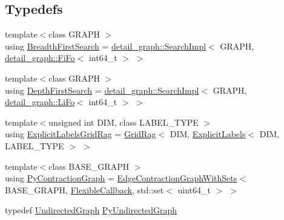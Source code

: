 \subsection*{Typedefs}
\begin{DoxyCompactItemize}
\item 
{\footnotesize template$<$class G\+R\+A\+PH $>$ }\\using \hyperlink{namespacenifty_1_1graph_a5cdea7eb940a178738d5f7ba11b92a15}{Breadth\+First\+Search} = \hyperlink{classnifty_1_1graph_1_1detail__graph_1_1SearchImpl}{detail\+\_\+graph\+::\+Search\+Impl}$<$ G\+R\+A\+PH, \hyperlink{structnifty_1_1graph_1_1detail__graph_1_1FiFo}{detail\+\_\+graph\+::\+Fi\+Fo}$<$ int64\+\_\+t $>$ $>$
\item 
{\footnotesize template$<$class G\+R\+A\+PH $>$ }\\using \hyperlink{namespacenifty_1_1graph_a3d6d4a5216a5d0a11785373bc7537085}{Depth\+First\+Search} = \hyperlink{classnifty_1_1graph_1_1detail__graph_1_1SearchImpl}{detail\+\_\+graph\+::\+Search\+Impl}$<$ G\+R\+A\+PH, \hyperlink{structnifty_1_1graph_1_1detail__graph_1_1LiFo}{detail\+\_\+graph\+::\+Li\+Fo}$<$ int64\+\_\+t $>$ $>$
\item 
{\footnotesize template$<$unsigned int D\+IM, class L\+A\+B\+E\+L\+\_\+\+T\+Y\+PE $>$ }\\using \hyperlink{namespacenifty_1_1graph_a45cca2dcd061996d13ec8e6bb8afb200}{Explicit\+Labels\+Grid\+Rag} = \hyperlink{classnifty_1_1graph_1_1GridRag}{Grid\+Rag}$<$ D\+IM, \hyperlink{classnifty_1_1graph_1_1ExplicitLabels}{Explicit\+Labels}$<$ D\+IM, L\+A\+B\+E\+L\+\_\+\+T\+Y\+PE $>$ $>$
\item 
{\footnotesize template$<$class B\+A\+S\+E\+\_\+\+G\+R\+A\+PH $>$ }\\using \hyperlink{namespacenifty_1_1graph_aa9ab054f2ea0df09d60d6adf1c7ee6b3}{Py\+Contraction\+Graph} = \hyperlink{classnifty_1_1graph_1_1EdgeContractionGraphWithSets}{Edge\+Contraction\+Graph\+With\+Sets}$<$ B\+A\+S\+E\+\_\+\+G\+R\+A\+PH, \hyperlink{structnifty_1_1graph_1_1FlexibleCallback}{Flexible\+Callback}, std\+::set$<$ uint64\+\_\+t $>$ $>$
\item 
typedef \hyperlink{classnifty_1_1graph_1_1UndirectedGraph}{Undirected\+Graph} \hyperlink{namespacenifty_1_1graph_a62ff5304d118f627910196adc6ab7aab}{Py\+Undirected\+Graph}
\end{DoxyCompactItemize}
